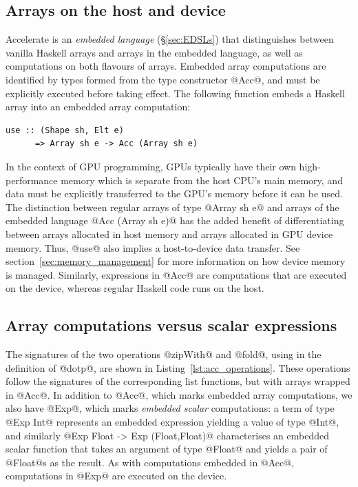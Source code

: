 \subsection{Arrays on the host and device}
\label{sec:arrays_on_the_host_and_device}

Accelerate is an \emph{embedded language} (\S\ref{sec:EDSLs}) that distinguishes
between vanilla Haskell arrays and arrays in the embedded language, as well as
computations on both flavours of arrays. Embedded array computations are
identified by types formed from the type constructor @Acc@, and must be
explicitly executed before taking effect. The following function embeds a
Haskell array into an embedded array computation:
%
\begin{lstlisting}[style=haskell]
  use :: (Shape sh, Elt e)
      => Array sh e -> Acc (Array sh e)
\end{lstlisting}
%
In the context of GPU programming, GPUs typically have their own
high-performance memory which is separate from the host CPU's main memory, and
data must be explicitly transferred to the GPU's memory before it can be used.
The distinction between regular arrays of type @Array sh e@ and arrays of the
embedded language @Acc (Array sh e)@ has the added benefit of differentiating
between arrays allocated in host memory and arrays allocated in GPU device
memory. Thus, @use@ also implies a host-to-device data transfer. See
section~\ref{sec:memory_management} for more information on how device memory is
managed. Similarly, expressions in @Acc@ are computations that are executed on
the device, whereas regular Haskell code runs on the host.


\subsection{Array computations versus scalar expressions}
\label{sec:array_computations_vs_scalar_expressions}

The signatures of the two operations @zipWith@ and @fold@, using in the
definition of @dotp@, are shown in Listing~\ref{lst:acc_operations}. These
operations follow the signatures of the corresponding list functions, but with
arrays wrapped in @Acc@. In addition to @Acc@, which marks embedded array
computations, we also have @Exp@, which marks \emph{embedded scalar}
computations: a term of type @Exp Int@ represents an embedded expression
yielding a value of type @Int@, and similarly @Exp Float -> Exp (Float,Float)@
characterises an embedded scalar function that takes an argument of type @Float@
and yields a pair of @Float@s as the result. As with computations embedded in
@Acc@, computations in @Exp@ are executed on the device.

